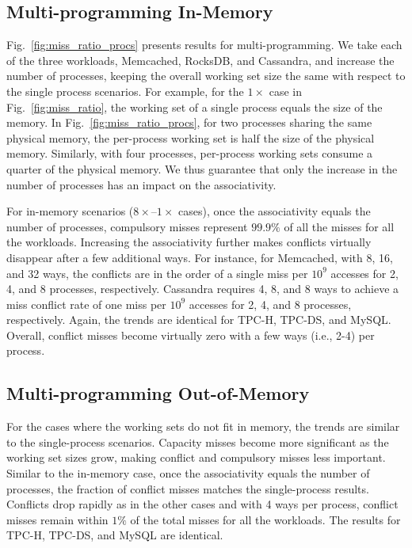 \subsection{Multi-programming In-Memory}
Fig.~\ref{fig:miss_ratio_procs} presents results for multi-programming. We take each of the three workloads, Memcached, RocksDB, and Cassandra, and increase the number of processes, keeping the overall working set size the same with respect to the single process scenarios. For example, for the $1\times$ case in Fig.~\ref{fig:miss_ratio}, the working set of a single process equals the size of the memory. In Fig.~\ref{fig:miss_ratio_procs}, for two processes sharing the same physical memory, the per-process working set is half the size of the physical memory. Similarly, with four processes, per-process working sets consume a quarter of the physical memory. We thus guarantee that only the increase in the number of processes has an impact on the associativity. 

For in-memory scenarios ($8\times$--$1\times$ cases), once the associativity equals the number of processes, compulsory misses represent $99.9\%$ of all the misses for all the workloads. Increasing the associativity further makes conflicts virtually disappear after a few additional ways. For instance, for Memcached, with 8, 16, and 32 ways, the conflicts are in the order of a single miss per $10^{9}$ accesses for 2, 4, and 8 processes, respectively. Cassandra requires 4, 8, and 8 ways to achieve a miss conflict rate of one miss per $10^{9}$ accesses for 2, 4, and 8 processes, respectively. Again, the trends are identical for TPC-H, TPC-DS, and MySQL. Overall, conflict misses become virtually zero with a few ways (i.e., 2-4) per process.

\subsection{Multi-programming Out-of-Memory}

For the cases where the working sets do not fit in memory, the trends are similar to the single-process scenarios. Capacity misses become more significant as the working set sizes grow, making conflict and compulsory misses less important. Similar to the in-memory case, once the associativity equals the number of processes, the fraction of conflict misses matches the single-process results. Conflicts drop rapidly as in the other cases and with 4 ways per process, conflict misses remain within $1\%$ of the total misses for all the workloads. The results for TPC-H, TPC-DS, and MySQL are identical.


